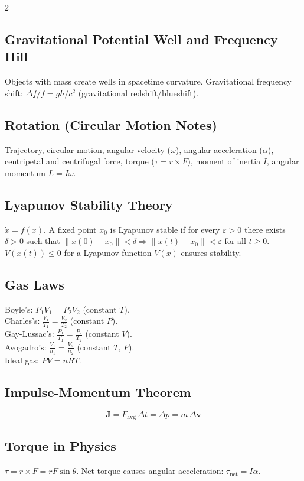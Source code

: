\documentclass[10pt,a4paper]{article}
\begin{document}
\begin{multicols}{2}
\subsection{Gravitational Potential Well and Frequency Hill}
Objects with mass create wells in spacetime curvature. Gravitational frequency shift: $\Delta f/f = gh/c^2$ (gravitational redshift/blueshift).

\subsection{Rotation (Circular Motion Notes)}
Trajectory, circular motion, angular velocity ($\omega$), angular acceleration ($\alpha$), centripetal and centrifugal force, torque ($\tau = r \times F$), moment of inertia $I$, angular momentum $L = I\omega$.

\subsection{Lyapunov Stability Theory}
$\dot{x} = f(x)$. A fixed point $x_0$ is Lyapunov stable if for every $\varepsilon>0$ there exists $\delta>0$ such that $\|x(0)-x_0\|<\delta \Rightarrow \|x(t)-x_0\|<\varepsilon$ for all $t\geq 0$.\\
$\dot{V}(x(t)) \leq 0$ for a Lyapunov function $V(x)$ ensures stability.

\subsection{Gas Laws}
Boyle's: $P_1V_1 = P_2V_2$ (constant $T$).\\
Charles's: $\frac{V_1}{T_1} = \frac{V_2}{T_2}$ (constant $P$).\\
Gay-Lussac's: $\frac{P_1}{T_1} = \frac{P_2}{T_2}$ (constant $V$).\\
Avogadro's: $\frac{V_1}{n_1} = \frac{V_2}{n_2}$ (constant $T$, $P$).\\
Ideal gas: $PV = nRT$.

\subsection{Impulse-Momentum Theorem}
\[
\mathbf{J} = F_\text{avg}\,\Delta t = \Delta p = m\,\Delta\mathbf{v}
\]

\subsection{Torque in Physics}
$\tau = r \times F = rF\sin\theta$. Net torque causes angular acceleration: $\tau_\text{net} = I\alpha$.


\end{multicols}
\end{document}
